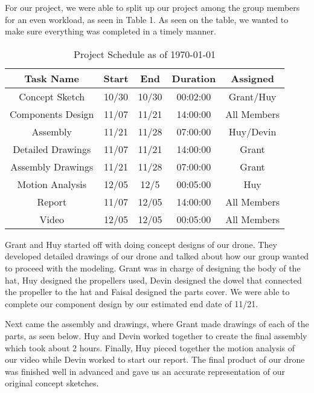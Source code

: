 
    For our project, we were able to split up our project among the group members for an even workload, as seen in Table 1. As seen on the table, we wanted to make sure everything was completed in a timely manner.\par

    \begin{table}[H]
        \begin{center}
        \begin{tabular}{|c|c|c|c|c|} \hline 
        \textbf{Task Name}& \textbf{Start}& \textbf{End}& \textbf{Duration}& \textbf{Assigned} \\ \hline
            Concept Sketch& 10/30& 10/30& 00:02:00&  Grant/Huy\\ \hline   
            Components Design& 11/07& 11/21& 14:00:00&  All Members\\ \hline
            Assembly& 11/21& 11/28& 07:00:00&  Huy/Devin\\ \hline 
            Detailed Drawings&11/07& 11/21& 14:00:00&  Grant\\ \hline 
            Assembly Drawings&11/21& 11/28& 07:00:00&  Grant\\ \hline 
            Motion Analysis&12/05& 12/5& 00:05:00&  Huy\\ \hline 
            Report&11/07& 12/05& 14:00:00&  All Members\\ \hline 
            Video&12/05& 12/05& 00:05:00&  All Members\\\hline
        \end{tabular}
        \end{center}
        \caption{Project Schedule as of \today}
        \label{tab:table1}
    \end{table}

    Grant and Huy started off with doing concept designs of our drone. They developed detailed drawings of our drone and talked about how our group wanted to proceed with the modeling. Grant was in charge of designing the body of the hat, Huy designed the propellers used, Devin designed the dowel that connected the propeller to the hat and Faisal designed the parts cover. We were able to complete our component design by our estimated end date of 11/21.

    Next came the assembly and drawings, where Grant made drawings of each of the parts, as seen below. Huy and Devin worked together to create the final assembly which took about 2 hours. Finally, Huy pieced together the motion analysis of our video while Devin worked to start our report. The final product of our drone was finished well in advanced and gave us an accurate representation of our original concept sketches.